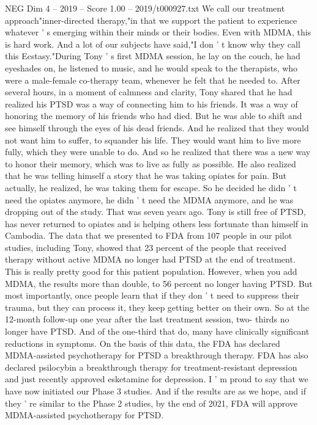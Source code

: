 \begin{textsample}{NEG Dim 4 – 2019 – Score 1.00 – 2019/t000927.txt}
We call our treatment approach"inner-directed therapy,"in that we support the patient to experience whatever ' s emerging within their minds or their bodies.
Even with MDMA, this is hard work.
And a lot of our subjects have said,"I don ' t know why they call this Ecstasy."During Tony ' s first MDMA session, he lay on the couch, he had eyeshades on, he listened to music, and he would speak to the therapists, who were a male-female co-therapy team, whenever he felt that he needed to.
After several hours, in a moment of calmness and clarity, Tony shared that he had realized his PTSD was a way of connecting him to his friends.
It was a way of honoring the memory of his friends who had died.
But he was able to shift and see himself through the eyes of his dead friends.
And he realized that they would not want him to suffer, to squander his life.
They would want him to live more fully, which they were unable to do.
And so he realized that there was a new way to honor their memory, which was to live as fully as possible.
He also realized that he was telling himself a story that he was taking opiates for pain.
But actually, he realized, he was taking them for escape.
So he decided he didn ' t need the opiates anymore, he didn ' t need the MDMA anymore, and he was dropping out of the study.
That was seven years ago.
Tony is still free of PTSD, has never returned to opiates and is helping others less fortunate than himself in Cambodia.
The data that we presented to FDA from 107 people in our pilot studies, including Tony, showed that 23 percent of the people that received therapy without active MDMA no longer had PTSD at the end of treatment.
This is really pretty good for this patient population.
However, when you add MDMA, the results more than double, to 56 percent no longer having PTSD.
But most importantly, once people learn that if they don ' t need to suppress their trauma, but they can process it, they keep getting better on their own.
So at the 12-month follow-up one year after the last treatment session, two- thirds no longer have PTSD.
And of the one-third that do, many have clinically significant reductions in symptoms.
On the basis of this data, the FDA has declared MDMA-assisted psychotherapy for PTSD a breakthrough therapy.
FDA has also declared psilocybin a breakthrough therapy for treatment-resistant depression and just recently approved esketamine for depression.
I ' m proud to say that we have now initiated our Phase 3 studies.
And if the results are as we hope, and if they ' re similar to the Phase 2 studies, by the end of 2021, FDA will approve MDMA-assisted psychotherapy for PTSD.

\end{textsample}

